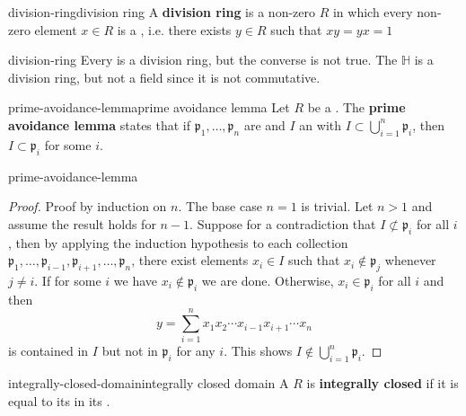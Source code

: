\begin{topic}{division-ring}{division ring}
    A \textbf{division ring} is a non-zero  $R$ in which every non-zero element $x \in R$ is a , i.e. there exists $y \in R$ such that $xy = yx = 1$
\end{topic}

\begin{example}{division-ring}
    Every  is a division ring, but the converse is not true. The  $\mathbb{H}$ is a division ring, but not a field since it is not commutative.
\end{example}

\begin{topic}{prime-avoidance-lemma}{prime avoidance lemma}
    Let $R$ be a . The \textbf{prime avoidance lemma} states that if $\mathfrak{p}_1, \ldots, \mathfrak{p}_n$ are  and $I$ an  with $I \subset \bigcup_{i = 1}^{n} \mathfrak{p}_i$, then $I \subset \mathfrak{p}_i$ for some $i$.
\end{topic}

\begin{example}{prime-avoidance-lemma}
    \begin{proof}
        Proof by induction on $n$. The base case $n = 1$ is trivial. Let $n > 1$ and assume the result holds for $n - 1$. Suppose for a contradiction that $I \not\subset \mathfrak{p}_i$ for all $i$, then by applying the induction hypothesis to each collection $\mathfrak{p}_1, \ldots, \mathfrak{p}_{i - 1}, \mathfrak{p}_{i + 1}, \ldots, \mathfrak{p}_n$, there exist elements $x_i \in I$ such that $x_i \not\in \mathfrak{p}_j$ whenever $j \ne i$. If for some $i$ we have $x_i \not\in \mathfrak{p}_i$ we are done. Otherwise, $x_i \in \mathfrak{p}_i$ for all $i$ and then
        \[ y = \sum_{i = 1}^{n} x_1 x_2 \cdots x_{i - 1} x_{i + 1} \cdots x_n \]
        is contained in $I$ but not in $\mathfrak{p}_i$ for any $i$. This shows $I \not\in \bigcup_{i = 1}^{n} \mathfrak{p}_i$.
    \end{proof}
\end{example}

\begin{topic}{integrally-closed-domain}{integrally closed domain}
    A  $R$ is \textbf{integrally closed} if it is equal to its  in its .
\end{topic}

